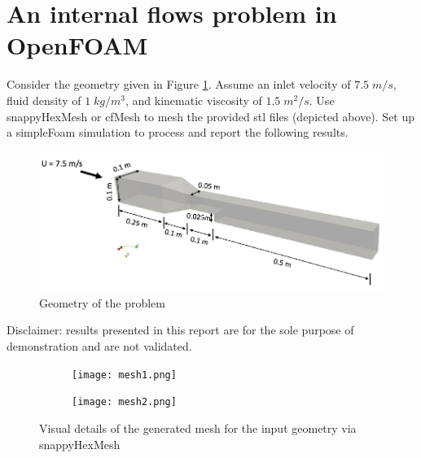 \documentclass[10pt,letterpaper]{article}
\newcommand{\mfont}[1]{{\fontfamily{qcr}\selectfont #1}}
\begin{document}
	\section*{An  internal flows problem in OpenFOAM}
Consider the geometry given in Figure \ref{fig:geo}. Assume an inlet velocity of $7.5\; m/s$, fluid density of $ 1\;kg/m^3$, and kinematic viscosity of $1.5 \;m^2/s$. Use snappyHexMesh or cfMesh to mesh the provided stl files (depicted above). Set up a simpleFoam simulation to process and report the following results.

\begin{figure}[H]
	\begin{center}
		\includegraphics[width=.9\linewidth]{geo.png}
	\end{center}
	\caption{Geometry of the problem}
	\label{fig:geo}
\end{figure}

	{
	\color{mblue}
	Disclaimer: results presented in this report are for the sole purpose of demonstration and are not validated.
}\\

	


\begin{figure}[H]
	\centering	
	\begin{subfigure}{0.7\columnwidth}	
		\centering
		\texttt{[image: mesh1.png]}
	\end{subfigure}
	\begin{subfigure}{0.7\columnwidth}	
		\centering
		\texttt{[image: mesh2.png]}
	\end{subfigure}
\caption{Visual details of the generated mesh for the input geometry via  \mfont{snappyHexMesh} }
\end{figure}
\end{document}

